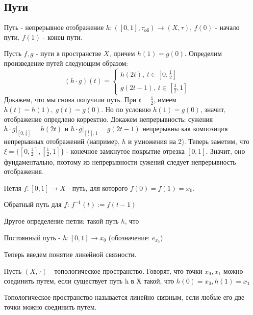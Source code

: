 \subsection{Пути}
\begin{defin}
    Путь - непрерывное отображение 
    $h\colon([0,1],\tau_\text{об})\to (X,\tau)$,
    $f(0)$ - начало пути, $f(1)$ - конец пути.
\end{defin}
Пусть $f,g$ - пути в пространстве  $X$, причем
$h(1)=g(0)$. Определим произведение путей следующим образом:
$$(h\cdot g)(t)=\begin{cases}
    h(2t),~t\in [0,\frac{1}{2}]\\g(2t-1),~t\in [\frac{1}{2},1]
\end{cases}$$
Докажем, что мы снова получили путь. При $t=\frac{1}{2}$, имеем 
$h(t)=h(1),~g(t)=g(0)$. Но по условию  $h(1)=g(0)$, значит, отображение
опредлено корректно. Докажем непрерывность: сужения  
$h\cdot g|_{[0,\frac{1}{2}]}=h(2t)$ и $h\cdot g|_{[\frac{1}{2}],1}=g(2t-1)$
непрерывны как композиция непрерывных отображений 
(например, $h$ и умножения на 2). Теперь заметим, что 
$\xi=\{[0,\frac{1}{2}],[\frac{1}{2},1]\}$ - конечное замкнутое покрытие 
отрезка $[0,1]$. Значит, оно фундаментально, поэтому из непрерывности
сужений следует непрерывность отображения. 
\begin{defin}
    Петля $f\colon[0,1]\to X$ - путь, для которого $f(0)=f(1)=x_0$. 
\end{defin}
\begin{defin}
Обратный путь для $f$:  $f^{-1}(t):=f(t-1)$
\end{defin}
Другое определение петли: такой путь $h$, что  %
\begin{defin}
    Постоянный путь - $h:[0,1]\to x_0$ (обозначение: $e_{x_0}$)
\end{defin}
Теперь введем понятие линейной связности. 
\begin{defin}
Пусть $(X,\tau)$ - топологическое пространство. Говорят, что точки
 $x_0,x_1$ можно соединить путем, если существует путь h  в Х такой, что
 $h(0)=x_0,h(1)=x_1$
\end{defin}
\begin{defin}
Топологическое пространство называется линейно связным, если любые его две
точки можно соединить путем. 
\end{defin}
